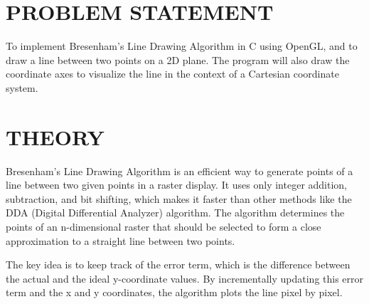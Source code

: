 \documentclass{article}
\begin{document}
\section*{PROBLEM STATEMENT}
To implement Bresenham's Line Drawing Algorithm in C using OpenGL, and to draw a line between two points on a 2D plane. The program will also draw the coordinate axes to visualize the line in the context of a Cartesian coordinate system.

\section*{THEORY}
Bresenham's Line Drawing Algorithm is an efficient way to generate points of a line between two given points in a raster display. It uses only integer addition, subtraction, and bit shifting, which makes it faster than other methods like the DDA (Digital Differential Analyzer) algorithm. The algorithm determines the points of an n-dimensional raster that should be selected to form a close approximation to a straight line between two points.

The key idea is to keep track of the error term, which is the difference between the actual and the ideal y-coordinate values. By incrementally updating this error term and the x and y coordinates, the algorithm plots the line pixel by pixel.
\end{document}
